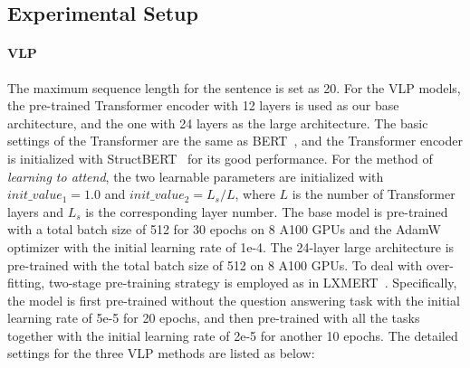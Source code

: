 \subsection{Experimental Setup}
\paragraph{VLP} The maximum sequence length for the sentence is set as 20. For the VLP models, the pre-trained Transformer encoder with 12 layers is used as our base architecture, and the one with 24 layers as the large architecture. The basic settings of the Transformer are the same as BERT~\citep{devlin2018bert}, and the Transformer encoder is initialized with StructBERT~\citep{wang2019structbert} for its good performance. For the method of \emph{learning to attend}, the two learnable parameters are initialized with $init\_value_1=1.0$ and $init\_value_2=L_s/L$, where $L$ is the number of Transformer layers and $L_s$ is the corresponding layer number. The base model is pre-trained with a total batch size of 512 for 30 epochs on 8 A100 GPUs and the AdamW optimizer with the initial learning rate of 1e-4. The 24-layer large architecture is pre-trained with the total batch size of 512 on 8 A100 GPUs. To deal with over-fitting, two-stage pre-training strategy is employed as in LXMERT~\citep{tan2019lxmert}. Specifically, the model is first pre-trained without the question answering task with the initial learning rate of 5e-5 for 20 epochs, and then pre-trained with all the tasks together with the initial learning rate of 2e-5 for another 10 epochs. The detailed settings for the three VLP methods are listed as below:
